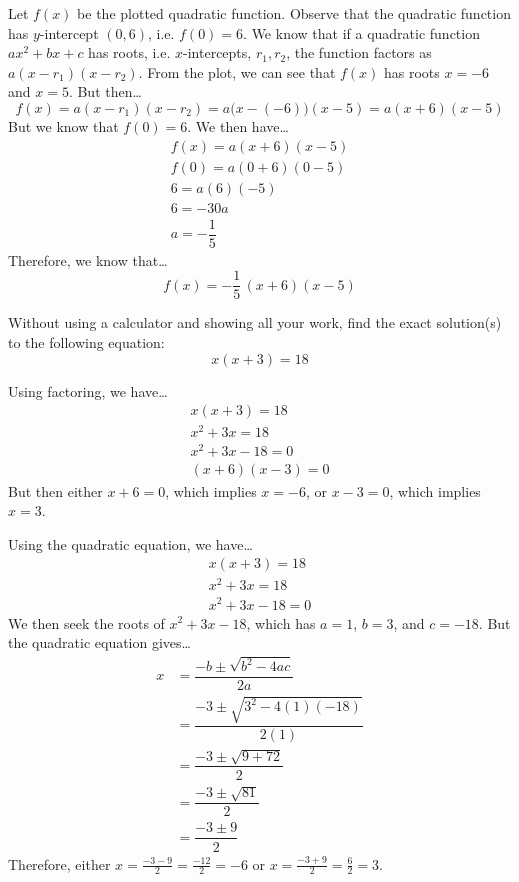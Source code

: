 \documentclass[12pt,letterpaper]{exam}
\begin{document}
\begin{questions}
\sol Let $f(x)$ be the plotted quadratic function. Observe that the quadratic function has $y$-intercept $(0, 6)$, i.e. $f(0)= 6$. We know that if a quadratic function $ax^2 + bx + c$ has roots, i.e. $x$-intercepts, $r_1, r_2$, the function factors as $a(x - r_1)(x - r_2)$. From the plot, we can see that $f(x)$ has roots $x= -6$ and $x= 5$. But then\dots
	\[
	f(x)= a(x - r_1)(x - r_2)= a \big(x - (-6) \big) (x - 5)= a(x + 6)(x - 5)
	\]
But we know that $f(0)= 6$. We then have\dots
	\[
	\begin{gathered}
	f(x)= a(x + 6)(x - 5) \\[0.3cm]
	f(0)= a(0 + 6)(0 - 5) \\[0.3cm]
	6= a(6)(-5) \\[0.3cm]
	6= -30a \\[0.3cm]
	a= -\dfrac{1}{5}
	\end{gathered}
	\]
Therefore, we know that\dots
	\[
	f(x)= -\dfrac{1}{5} \, (x + 6)(x - 5)
	\]



\newpage
\question[10] Without using a calculator and showing all your work, find the exact solution(s) to the following equation:
	\[
	x(x + 3)= 18
	\] \pspace

\sol Using factoring, we have\dots
	\[
	\begin{gathered}
	x(x + 3)= 18 \\[0.3cm]
	x^2 + 3x= 18 \\[0.3cm]
	x^2 + 3x - 18= 0 \\[0.3cm]
	(x + 6)(x - 3)= 0
	\end{gathered}
	\]
But then either $x + 6= 0$, which implies $x= -6$, or $x - 3= 0$, which implies $x= 3$. \pspace

Using the quadratic equation, we have\dots
	\[
	\begin{gathered}
	x(x + 3)= 18 \\[0.3cm]
	x^2 + 3x= 18 \\[0.3cm]
	x^2 + 3x - 18= 0 
	\end{gathered}
	\]
We then seek the roots of $x^2 + 3x - 18$, which has $a= 1$, $b= 3$, and $c= -18$. But the quadratic equation gives\dots
	\[
	\begin{aligned}
	x&= \dfrac{-b \pm \sqrt{b^2 - 4ac}}{2a} \\[0.3cm]
	&= \dfrac{-3 \pm \sqrt{3^2 - 4(1)(-18)}}{2(1)} \\[0.3cm]
	&= \dfrac{-3 \pm \sqrt{9 + 72}}{2} \\[0.3cm]
	&= \dfrac{-3 \pm \sqrt{81}}{2} \\[0.3cm]
	&= \dfrac{-3 \pm 9}{2}
	\end{aligned}
	\]
Therefore, either $x= \frac{-3 - 9}{2}= \frac{-12}{2}= -6$ or $x= \frac{-3 + 9}{2}= \frac{6}{2}= 3$. 




\end{questions}
\end{document}
